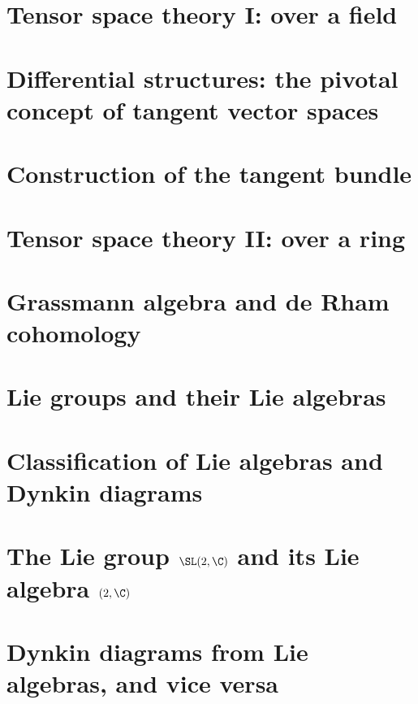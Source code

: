\documentclass[a4paper,11pt]{article}
\theoremstyle{definition} %
\theoremstyle{plain} %
\theoremstyle{remark} %
\begin{document}
 \section{Tensor space theory I: over a field}
 
 \newpage

  \section{Differential structures: the pivotal concept of tangent vector spaces}
  
  \newpage

 \section{Construction of the tangent bundle}
 
 \newpage

 \section{Tensor space theory II: over a ring}
 
 \newpage

 \section{Grassmann algebra and de Rham cohomology}
 
 \newpage

 \section{Lie groups and their Lie algebras}
 
 \newpage

 \section{Classification of Lie algebras and Dynkin diagrams}
 
 \newpage

 \section{The Lie group \texorpdfstring{$\SL(2,\C)$}{SL(2,C)} and its Lie algebra \texorpdfstring{$\sl(2,\C)$}{sl(2,C)}}
 
 \newpage

 \section{Dynkin diagrams from Lie algebras, and vice versa}
 
 \newpage
\end{document}
